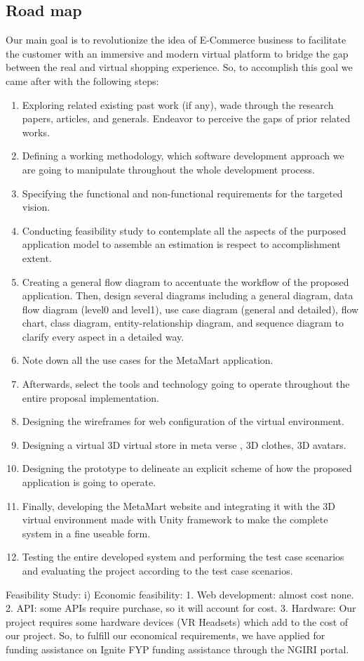 \subsection{Road map}
Our main goal is to revolutionize the idea of E-Commerce business to facilitate the customer with an immersive and modern virtual platform to bridge the gap between the real and virtual shopping experience. So, to accomplish this goal we came after with the following steps:
\begin{enumerate}
    \item 	Exploring related existing past work (if any), wade through the research papers, articles, and generals. Endeavor to perceive the gaps of prior related works.
    \item Defining a working methodology, which software development approach we are going to manipulate throughout the whole development process.
    \item Specifying the functional and non-functional requirements for the targeted vision.
    \item Conducting feasibility study to contemplate all the aspects of the purposed application model to assemble an estimation is respect to accomplishment extent.
    \item Creating a general flow diagram to accentuate the workflow of the proposed application. Then, design several diagrams including a general diagram, data flow diagram (level0 and level1), use case diagram (general and detailed), flow chart, class diagram, entity-relationship diagram, and sequence diagram to clarify every aspect in a detailed way. 
     \item Note down all the use cases for the MetaMart application.
    \item Afterwards, select the tools and technology going to operate throughout the entire proposal implementation.
    \item Designing the wireframes for web configuration of the virtual environment.
    \item Designing a virtual 3D virtual store in meta verse , 3D clothes, 3D avatars.
    \item Designing the prototype to delineate an explicit scheme of how the proposed application is going to operate.
    \item Finally, developing the MetaMart website and integrating it with the 3D virtual environment made with Unity framework to make the complete system in a fine useable form.
    \item Testing the entire developed system and performing the test case scenarios and evaluating the project according to the test case scenarios.
\end{enumerate}
Feasibility Study:
i)	Economic feasibility:
1.  Web development: almost cost none.
2.  API: some APIs require purchase, so it will account for cost.
3.  Hardware: Our project requires some hardware devices (VR Headsets) which add to the cost of our project. So, to fulfill our economical requirements, we have applied for funding assistance on Ignite FYP funding assistance through the NGIRI portal.

